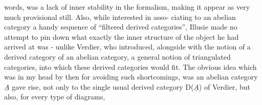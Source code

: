 words,  was a lack of inner stability in the formalism, making it
appear as very much provisional still. Also, while interested in asso-%
ciating to an abelian category a handy sequence of ``filtered derived
categories'', Illusie made no attempt to pin down what exactly the
inner structure of the object he had arrived at was - unlike Verdier,
who  introduced, alongside with the notion of a derived category of an
abelian category, a general notion of triangulated categories, into
which these derived categories would fit. The obvious idea which was in
my head by then for avoiding such shortcomings, was  an
abelian category $\underline{A}$ gave rise, not only to the  single usual
derived category D($\underline{A}$) of Verdier, but also, for every type of diagrams,

